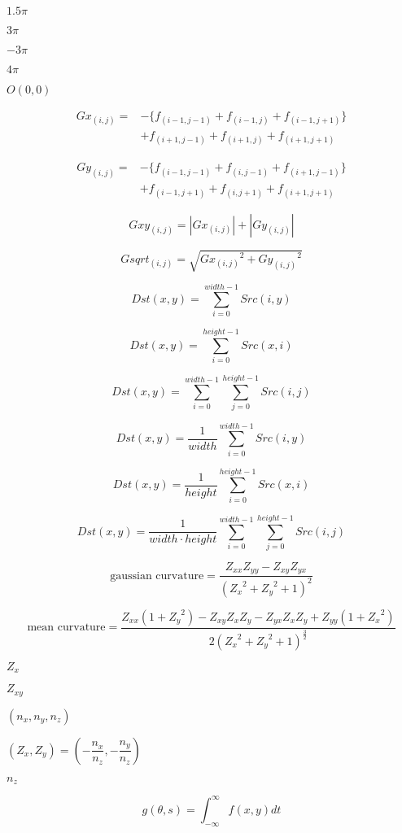 \documentclass{article}
\begin{document}
{$1.5\pi$
\pagebreak

$3\pi$
\pagebreak

$-3\pi$
\pagebreak

$4\pi$
\pagebreak

$O\left(0,0\right)$
\pagebreak

\begin{eqnarray*} Gx_{(i,j)} = &- \{ f_{(i-1,j-1)} + f_{(i-1,j)} + f_{(i-1,j+1)} \} \\ &+ f_{(i+1,j-1)} + f_{(i+1,j)} + f_{(i+1,j+1)} \end{eqnarray*}
\pagebreak

\begin{eqnarray*} Gy_{(i,j)} = &- \{ f_{(i-1,j-1)} + f_{(i,j-1)} + f_{(i+1,j-1)} \} \\ &+ f_{(i-1,j+1)} + f_{(i,j+1)} + f_{(i+1,j+1)} \end{eqnarray*}
\pagebreak

\[ Gxy_{(i,j)} = |Gx_{(i,j)}| + |Gy_{(i,j)}| \]
\pagebreak

\[ Gsqrt_{(i,j)} = \sqrt{ {Gx_{(i,j)}}^{2} + {Gy_{(i,j)}}^{2} } \]
\pagebreak

\[ Dst(x,y) = \sum_{i=0}^{width-1} Src(i,y) \]
\pagebreak

\[ Dst(x,y) = \sum_{i=0}^{height-1} Src(x,i) \]
\pagebreak

\[ Dst(x,y) = \sum_{i=0}^{width-1} \sum_{j=0}^{height-1} Src(i,j) \]
\pagebreak

\[ Dst(x,y) = \frac{1}{width}\sum_{i=0}^{width-1} Src(i,y) \]
\pagebreak

\[ Dst(x,y) = \frac{1}{height}\sum_{i=0}^{height-1} Src(x,i) \]
\pagebreak

\[ Dst(x,y) = \frac{1}{width \cdot height} \sum_{i=0}^{width-1} \sum_{j=0}^{height-1} Src(i,j) \]
\pagebreak

\[ \textrm{gaussian curvature}=\dfrac {Z_{xx}Z_{yy}-Z_{xy}Z_{yx}}{({Z_x}^2+{Z_y}^2+1)^2} \]
\pagebreak

\[ \textrm{mean curvature}=\dfrac {Z_{xx}(1+{Z_y}^2)-Z_{xy}Z_{x}Z_{y}-Z_{yx}Z_{x}Z_{y}+Z_{yy}(1+{Z_x}^2)}{2({Z_x}^2+{Z_y}^2+1)^{\frac {3} {2}}} \]
\pagebreak

$ Z_{x} $
\pagebreak

$ Z_{xy} $
\pagebreak

$ (n_{x},n_{y},n_{z})$
\pagebreak

$ (Z_{x},Z_{y})=(-\dfrac{n_{x}}{n_{z}},-\dfrac{n_{y}}{n_{z}})$
\pagebreak

$ n_z $
\pagebreak

\[ g( \theta, s ) = \int_{ -\infty}^{\infty} f( x, y ) dt \]
\pagebreak

}
\end{document}
